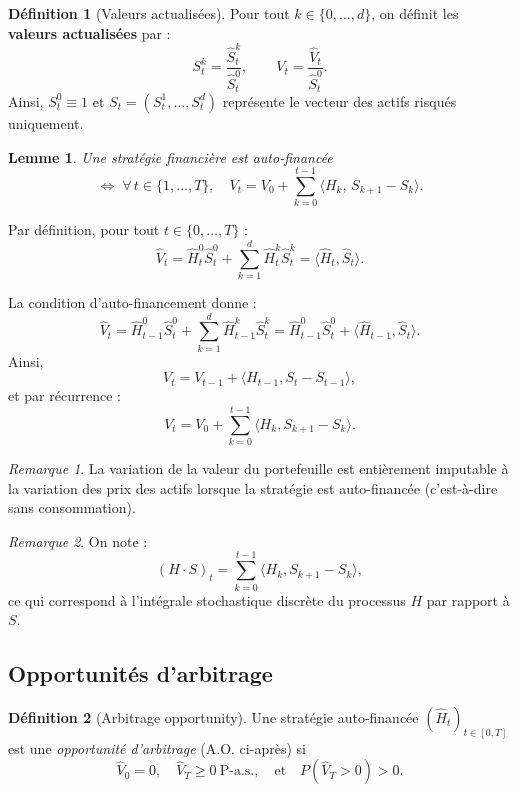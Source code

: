 \documentclass[12pt,a4paper]{article}
\makeatletter
\numberwithin{equation}{section}
\theoremstyle{plain} %
\newtheorem{lemme}{Lemme}
\theoremstyle{definition} %
\newtheorem{definition}{Définition}          %
\theoremstyle{remark} %
\newtheorem*{remarque}{Remarque}
\theoremstyle{myexample}
\theoremstyle{definition}
\renewenvironment{proof}[1][\proofname]{%
  \par\vspace{0.8em}%
  \pushQED{\qed}%
  \normalfont\color{cyan}%
  \topsep6\p@\@plus6\p@\relax
  \trivlist
  \item[\hskip\labelsep\bfseries\color{cyan}#1\@addpunct{.}]\ignorespaces
}{%
  \popQED\endtrivlist\vspace{0.8em}%
}
\makeatother
\begin{document}
\begin{definition}[Valeurs actualisées]
Pour tout $k\in\{0,\ldots,d\}$, on définit les \textbf{valeurs actualisées} par :
\[
S_t^k = \frac{\hat S_t^k}{\hat S_t^0}, \qquad V_t = \frac{\hat V_t}{\hat S_t^0}.
\]
Ainsi, $S_t^0 \equiv 1$ et $S_t = (S_t^1,\ldots,S_t^d)$ représente le vecteur des actifs risqués uniquement.
\end{definition}

\begin{lemme}

\emph{Une stratégie financière est auto-financée}
\[
\Longleftrightarrow\;
\forall\, t \in \{1,\ldots,T\},\quad
V_t = V_0 + \sum_{k=0}^{t-1} \langle H_k,\, S_{k+1} - S_k \rangle.
\]
\end{lemme}



\begin{proof}
Par définition, pour tout $t\in\{0,\ldots,T\}$ :
\[
\hat V_t = \hat H_t^0 \hat S_t^0 + \sum_{k=1}^d \hat H_t^k \hat S_t^k = \langle \hat H_t, \hat S_t \rangle.
\]

La condition d’auto-financement donne :
\[
\hat V_t = \hat H_{t-1}^0 \hat S_t^0 + \sum_{k=1}^d \hat H_{t-1}^k \hat S_t^k = \hat H_{t-1}^0 \hat S_t^0 + \langle \hat H_{t-1}, \hat S_t \rangle.
\]
Ainsi,
\[
V_t = V_{t-1} + \langle H_{t-1}, S_t - S_{t-1} \rangle,
\]
et par récurrence :
\[
V_t = V_0 + \sum_{k=0}^{t-1} \langle H_k, S_{k+1} - S_k \rangle.
\]
\end{proof}

\begin{remarque}
La variation de la valeur du portefeuille est entièrement imputable à la variation des prix des actifs lorsque la stratégie est auto-financée (c’est-à-dire sans consommation).
\end{remarque}

\begin{remarque}
On note :
\[
(H \cdot S)_t = \sum_{k=0}^{t-1} \langle H_k, S_{k+1} - S_k \rangle,
\]
ce qui correspond à l’intégrale stochastique discrète du processus $H$ par rapport à $S$.
\end{remarque}


\subsection{Opportunités d’arbitrage}

\begin{definition}[Arbitrage opportunity]
Une stratégie auto-financée $(\hat H_t)_{t\in[0,T]}$ est une \emph{opportunité d’arbitrage} (A.O. ci-après) si
\[
\hat V_0 = 0, 
\quad \hat V_T \ge 0 \ \text{P-a.s.}, 
\quad \text{et} \quad P(\hat V_T > 0) > 0.
\]
\end{definition}
\end{document}
